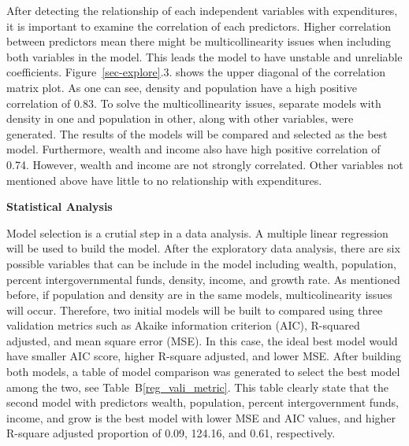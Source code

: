 \documentclass[11pt]{article}\usepackage[]{graphicx}\usepackage[]{color}
\begin{document}
\noindent After detecting the relationship of each independent variables with expenditures, it is important to examine the correlation of each predictors. Higher correlation between predictors mean there might be multicollinearity issues when including both variables in the model. This leads the model to have unstable and unreliable coefficients. Figure~\ref{sec-explore}.3. shows the upper diagonal of the correlation matrix plot. As one can see, density and population have a high positive correlation of 0.83. To solve the multicollinearity issues, separate models with density in one and population in other, along with other variables, were generated. The results of the models will be compared and selected as the best model. Furthermore, wealth and income also have high positive correlation of 0.74. However, wealth and income are not strongly correlated. Other variables not mentioned above have little to no relationship with expenditures.          
\hfill \break

\noindent\textbf{Statistical Analysis}



\noindent Model selection is a crutial step in a data analysis. A multiple linear regression will be used to build the model. After the exploratory data analysis, there are six possible variables that can be include in the model including wealth, population, percent intergovernmental funds, density, income, and growth rate. As mentioned before, if population and density are in the same models, multicolinearity issues will occur. Therefore, two initial models will be built to compared using three validation metrics such as Akaike information criterion (AIC), R-squared adjusted, and mean square error (MSE). In this case, the ideal best model would have smaller AIC score, higher R-square adjusted, and lower MSE. After building both models, a table of model comparison was generated to select the best model among the two, see Table~B\ref{reg_vali_metric}. This table clearly state that the second model with predictors wealth, population, percent intergovernment funds, income, and grow is the best model with lower MSE and AIC values, and higher R-square adjusted proportion of 0.09, 124.16, and 0.61, respectively.
\end{document}
